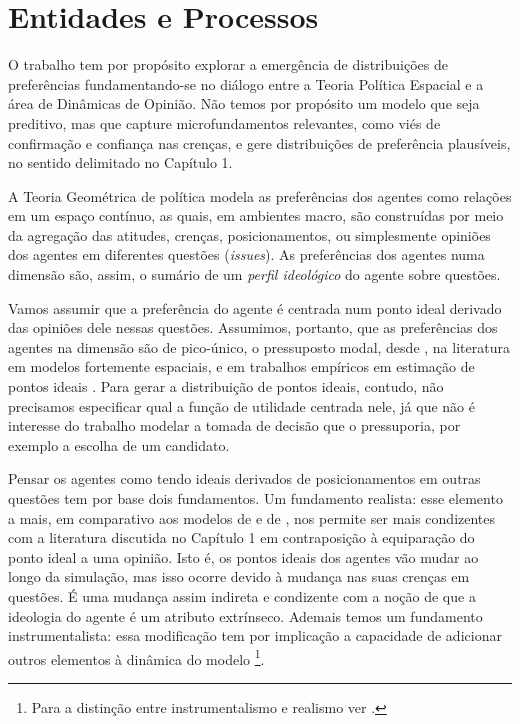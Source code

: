 
\section{Entidades e Processos}

O trabalho tem por propósito explorar a emergência de distribuições de
preferências fundamentando-se no diálogo entre a Teoria Política Espacial e a
área de Dinâmicas de Opinião. Não temos por propósito um modelo que seja
preditivo, mas que capture microfundamentos relevantes, como viés de confirmação
e confiança nas crenças, e gere distribuições de preferência plausíveis, no
sentido delimitado no Capítulo 1.

A Teoria Geométrica de política modela as preferências dos agentes como relações
em um espaço contínuo, as quais, em ambientes macro, são construídas por meio da
agregação das atitudes, crenças, posicionamentos, ou simplesmente opiniões dos
agentes em diferentes questões (\textit{issues}). As preferências dos agentes
numa dimensão são, assim, o sumário de um \textit{perfil ideológico} do agente
sobre questões.

Vamos assumir que a preferência do agente é centrada num ponto ideal derivado
das opiniões dele nessas questões. Assumimos, portanto, que as preferências dos
agentes na dimensão são de pico-único, o pressuposto modal, desde
, na literatura em modelos fortemente espaciais, e
em trabalhos empíricos em estimação de pontos ideais \cite{carroll2013structure,
  armstrong2014analyzing, schofield1998nash}. Para gerar a distribuição de
pontos ideais, contudo, não precisamos especificar qual a função de utilidade
centrada nele, já que não é interesse do trabalho modelar a tomada de decisão
que o pressuporia, por exemplo a escolha de um candidato.

Pensar os agentes como tendo ideais derivados de posicionamentos em outras
questões tem por base dois fundamentos. Um fundamento realista: esse elemento a
mais, em comparativo aos modelos de  e de
, nos permite ser mais condizentes com a
literatura discutida no Capítulo 1 em contraposição à equiparação do ponto ideal
a uma opinião. Isto é, os pontos ideais dos agentes vão mudar ao longo da
simulação, mas isso ocorre devido à mudança nas suas crenças em questões. É uma
mudança assim indireta e condizente com a noção de que a ideologia do agente é
um atributo extrínseco. Ademais temos um fundamento instrumentalista: essa
modificação tem por implicação a capacidade de adicionar outros elementos à
dinâmica do modelo \footnote{Para a distinção entre instrumentalismo e realismo
  ver .}.


